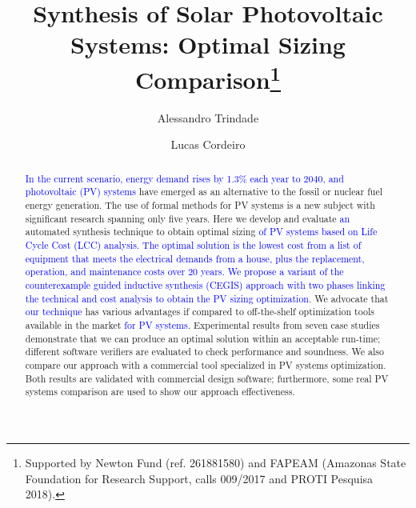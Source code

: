 \documentclass[runningheads]{llncs}
\begin{document}
%
\title{Synthesis of Solar Photovoltaic Systems: Optimal Sizing Comparison\thanks{Supported by Newton Fund (ref. 261881580) and FAPEAM (Amazonas State Foundation for Research Support, calls 009/2017 and PROTI Pesquisa 2018).}}
%
%
\author{Alessandro Trindade \and Lucas Cordeiro} %
%
%
\maketitle    %


\begin{abstract}
\textcolor{blue}{In the current scenario, energy demand rises by 1.3\% each year to 2040, and photovoltaic (PV) systems} have emerged as an alternative to the fossil or nuclear fuel energy generation. The use of formal methods for PV systems is a new subject with significant research spanning only five years. Here we develop and evaluate \textcolor{blue}{an} automated synthesis technique to obtain optimal sizing \textcolor{blue}{of PV systems based on Life Cycle Cost (LCC) analysis. The optimal solution is the lowest cost from a list of equipment that meets the electrical demands from a house, plus the replacement, operation, and maintenance costs over $20$ years. We propose a variant of the counterexample guided inductive synthesis (CEGIS) approach with two phases linking the technical and cost analysis to obtain the PV sizing optimization}. We advocate that \textcolor{blue}{our technique} has various advantages if compared to off-the-shelf optimization tools available in the market \textcolor{blue}{for PV systems}. Experimental results from seven case studies demonstrate that we can produce an optimal solution within an acceptable run-time; different software verifiers are evaluated to check performance and soundness. We also compare our approach with a commercial tool specialized in PV systems optimization. Both results are validated with commercial design software; furthermore, some real PV systems comparison are used to show our approach effectiveness. 
\end{abstract}
\end{document}
